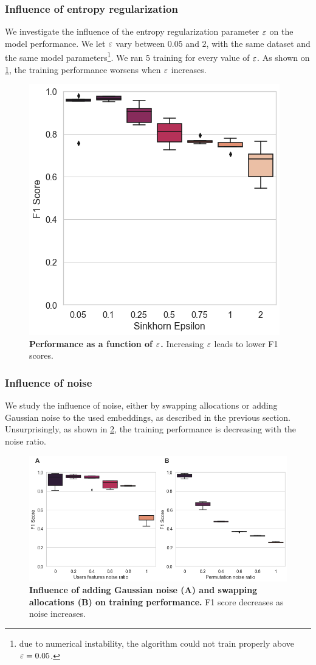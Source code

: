 \subsubsection*{Influence of entropy regularization}
We investigate the influence of the entropy regularization parameter $\varepsilon$ on the model performance. We let $\varepsilon$ vary between $0.05$ and $2$, with the same dataset and the same model parameters\footnote{due to numerical instability, the algorithm could not train properly above $\varepsilon = 0.05$.}. We ran 5 training for every value of $\varepsilon$. As shown on \cref{fig:experiment_epsilon}, the training performance worsens when $\varepsilon$ increases.

\begin{figure}[h]
    \centering
    \includegraphics[width=.45\columnwidth]{images/simca/experiment_epsilon_boxplot.png}
    \caption{
        \textbf{Performance as a function of $\varepsilon$.} Increasing $\varepsilon$ leads to lower F1 scores.
    }
    \label{fig:experiment_epsilon}
\end{figure}

\subsubsection*{Influence of noise}
We study the influence of noise, either by swapping allocations or adding Gaussian noise to the used embeddings, as described in the previous section. Unsurprisingly, as shown in \cref{fig:experiment_noise}, the training performance is decreasing with the noise ratio.

\begin{figure}[h]
    \centering
    \includegraphics[width=.9\columnwidth]{images/simca/experiment_noise_boxplot.png}
    \caption{
        \textbf{Influence of adding Gaussian noise (A) and swapping allocations (B) on training performance.} F1 score decreases as noise increases.
    }
    \label{fig:experiment_noise}
\end{figure}

